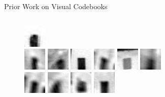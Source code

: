 \documentclass[mathserif]{beamer}
\begin{document}
\begin{frame}{Prior Work on Visual Codebooks}
\begin{columns}
\begin{column}{.5\textwidth}
\begin{figure}
                \includegraphics[width=.5cm]{illustrations/related_work/video_google/video_google_dict2_12}\\
                \includegraphics[width=.5cm]{illustrations/related_work/video_google/video_google_dict2_13}
                \includegraphics[width=.5cm]{illustrations/related_work/video_google/video_google_dict2_14}
                \includegraphics[width=.5cm]{illustrations/related_work/video_google/video_google_dict2_15}
                \includegraphics[width=.5cm]{illustrations/related_work/video_google/video_google_dict2_16}
                \includegraphics[width=.5cm]{illustrations/related_work/video_google/video_google_dict2_17}
                \includegraphics[width=.5cm]{illustrations/related_work/video_google/video_google_dict2_18}\\
                \includegraphics[width=.5cm]{illustrations/related_work/video_google/video_google_dict2_19}
                \includegraphics[width=.5cm]{illustrations/related_work/video_google/video_google_dict2_20}
                \includegraphics[width=.5cm]{illustrations/related_work/video_google/video_google_dict2_21}
                \includegraphics[width=.5cm]{illustrations/related_work/video_google/video_google_dict2_22}

\end{figure}
\end{column}
\end{columns}
\end{frame}
\end{document}
